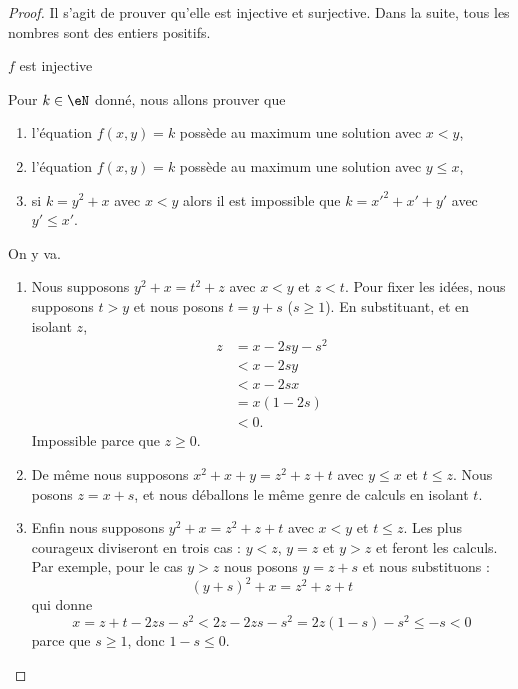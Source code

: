 \begin{proof}
    Il s'agit de prouver qu'elle est injective et surjective. Dans la suite, tous les nombres sont des entiers positifs.
    \begin{subproof}
        \item[\( f\) est injective]

            Pour \( k\in \eN\) donné, nous allons prouver que
            \begin{enumerate}
                \item
                    l'équation \( f(x,y)=k\) possède au maximum une solution avec \( x<y\),
                \item
                    l'équation \( f(x,y)=k\) possède au maximum une solution avec \( y\leq x\),
                \item
                    si \(   k=y^2+x \) avec \( x<y\) alors il est impossible que \( k=x'^2+x'+y'\) avec \( y'\leq x'\).
            \end{enumerate}
            On y va.
            \begin{enumerate}
                \item
                    Nous supposons \( y^2+x=t^2+z\) avec \( x<y\) et \( z<t\). Pour fixer les idées, nous supposons \( t>y\) et nous posons \( t=y+s\) (\( s\geq 1\)). En substituant, et en isolant \( z\),
                    \begin{subequations}
                        \begin{align}
                            z&=x-2sy-s^2\\
                            &<x-2sy\\
                            &<x-2sx\\
                            &=x(1-2s)\\
                            &<0.
                        \end{align}
                    \end{subequations}
                    Impossible parce que \( z\geq 0\).
                \item
                    De même nous supposons \( x^2+x+y=z^2+z+t\) avec \( y\leq x\) et \( t\leq z\). Nous posons \( z=x+s\), et nous déballons le même genre de calculs en isolant \( t\).
                \item
                    Enfin nous supposons \( y^2+x=z^2+z+t\) avec \( x<y\) et \( t\leq z\). Les plus courageux diviseront en trois cas : \( y<z\), \( y=z\) et \( y>z\) et feront les calculs. Par exemple, pour le cas \( y>z\) nous posons \( y=z+s\) et nous substituons :
                    \begin{equation}
                        (y+s)^2+x=z^2+z+t
                    \end{equation}
                    qui donne
                    \begin{equation}
                        x=z+t-2zs-s^2<2z-2zs-s^2=2z(1-s)-s^2\leq -s<0
                    \end{equation}
                    parce que \( s\geq 1\), donc \( 1-s\leq 0\).
            \end{enumerate}


\end{subproof}
\end{proof}
